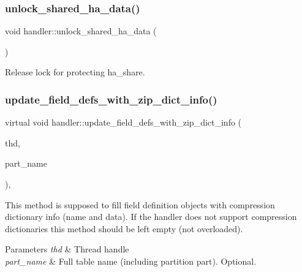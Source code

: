 \subsubsection{\texorpdfstring{unlock\+\_\+shared\+\_\+ha\+\_\+data()}{unlock\_shared\_ha\_data()}}
{\footnotesize\ttfamily void handler\+::unlock\+\_\+shared\+\_\+ha\+\_\+data (\begin{DoxyParamCaption}{ }\end{DoxyParamCaption})\hspace{0.3cm}{\ttfamily [protected]}}

Release lock for protecting ha\+\_\+share. \mbox{\label{classhandler_af07d741fb837dacdddc29c1d7e912204}} 
\subsubsection{\texorpdfstring{update\+\_\+field\+\_\+defs\+\_\+with\+\_\+zip\+\_\+dict\+\_\+info()}{update\_field\_defs\_with\_zip\_dict\_info()}}
{\footnotesize\ttfamily virtual void handler\+::update\+\_\+field\+\_\+defs\+\_\+with\+\_\+zip\+\_\+dict\+\_\+info (\begin{DoxyParamCaption}\item[{T\+HD $\ast$}]{thd,  }\item[{const char $\ast$}]{part\+\_\+name }\end{DoxyParamCaption})\hspace{0.3cm}{\ttfamily [inline]}, {\ttfamily [virtual]}}

This method is supposed to fill field definition objects with compression dictionary info (name and data). If the handler does not support compression dictionaries this method should be left empty (not overloaded).


\begin{DoxyParams}{Parameters}
{\em thd} & Thread handle \\
\hline
{\em part\+\_\+name} & Full table name (including partition part). Optional. \\
\hline
\end{DoxyParams}
\mbox{\label{classhandler_adac21f2d10c4463fb1d7e14882c6314f}} 

